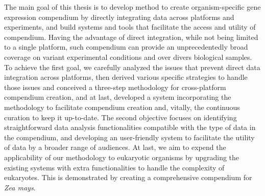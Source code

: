 


The main goal of this thesis is to develop method to create organism-specific
gene expression compendium by directly integrating data across platforms and
experiments, and build systems and tools that facilitate the access and utility
of compendium.
%
Having the advantage of direct integration, while not being limited to a single
platform, such compendium can provide an unprecedentedly broad coverage on
variant experimental conditions and over divers biological samples.
%
To achieve the first goal, we carefully analyzed the issues that prevent direct
data integration across platforms, then derived various specific strategies to
handle those issues and conceived a three-step methodology for cross-platform
compendium creation, and at last, developed a system incorporating the
methodology to facilitate compendium creation and, vitally, the continuous
curation to keep it up-to-date.
%
The second objective focuses on identifying straightforward data analysis
functionalities compatible with the type of data in the compendium, and
developing an user-friendly system to facilitate the utility of data by a
broader range of audiences.
%
At last, we aim to expend the applicability of our methodology to eukaryotic
organisms by upgrading the existing systems with extra functionalities to handle
the complexity of eukaryotes.
%
This is demonstrated by creating a comprehensive compendium for \textit{Zea
  mays}.


